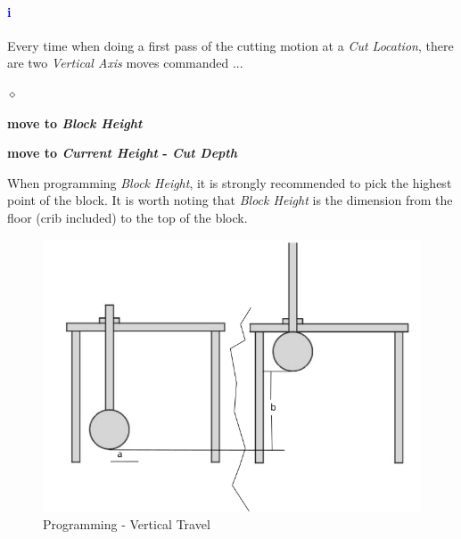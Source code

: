 \paragraph{\textbf{\LARGE \textcolor{blue}{i}}}Every time when doing a first pass of the cutting motion at a \textit{Cut Location}, there are two \textit{Vertical Axis} moves commanded ...
\begin{list}{$\diamond$}{}
	\item \textbf{move to \textit{Block Height}}
	\item \textbf{move to \textit{Current Height} - \textit{Cut Depth}}
\end{list}
When programming \textit{Block Height}, it is strongly recommended to pick the highest point of the block. It is worth noting that \textit{Block Height} is the dimension from the floor (crib included) to the top of the block.
\begin{figure}
	\centering
	\includegraphics[width=0.5\linewidth]{screen-captures/program/kodiak-saw-vert-travel}
	\caption{Programming - Vertical Travel}
	\label{fig:prg-vert-travel}
\end{figure}
\pagebreak
